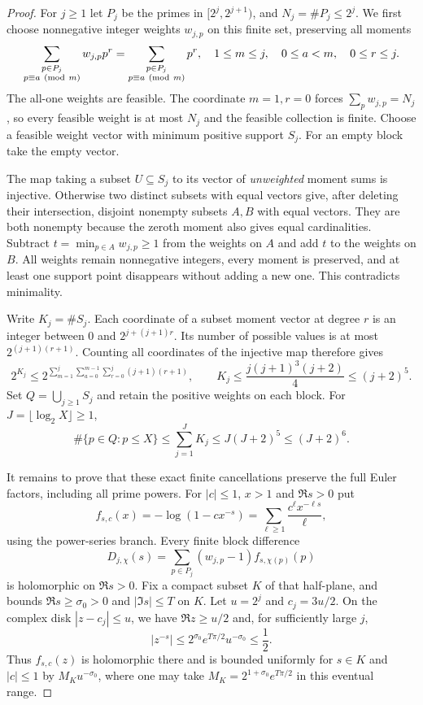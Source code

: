 \documentclass[11pt]{article}
\theoremstyle{definition}
\begin{document}
\begin{proof}
For $j\ge1$ let $P_j$ be the primes in $[2^j,2^{j+1})$,
and $N_j=\#P_j\le2^j$. We first choose nonnegative integer
weights $w_{j,p}$ on this finite set, preserving all moments
\begin{equation}\label{eq:prime-compression-moments}
 \sum_{\substack{p\in P_j\\p\equiv a\ ({\rm mod}\ m)}}
       w_{j,p}p^r
 =\sum_{\substack{p\in P_j\\p\equiv a\ ({\rm mod}\ m)}}p^r,
 \quad 1\le m\le j,\quad0\le a<m,\quad0\le r\le j.
\end{equation}
The all-one weights are feasible. The coordinate $m=1,r=0$
forces $\sum_p w_{j,p}=N_j$, so every feasible weight is
at most $N_j$ and the feasible collection is finite. Choose
a feasible weight vector with minimum positive support $S_j$.
For an empty block take the empty vector.

The map taking a subset $U\subseteq S_j$ to its vector of
\emph{unweighted} moment sums is injective. Otherwise two
distinct subsets with equal vectors give, after deleting their
intersection, disjoint nonempty subsets $A,B$ with equal
vectors. They are both nonempty because the zeroth moment
also gives equal cardinalities. Subtract
$t=\min_{p\in A}w_{j,p}\ge1$ from the weights on $A$ and add
$t$ to the weights on $B$. All weights remain nonnegative
integers, every moment is preserved, and at least one support
point disappears without adding a new one. This contradicts
minimality.

Write $K_j=\#S_j$. Each coordinate of a subset moment vector
at degree $r$ is an integer between $0$ and
$2^{j+(j+1)r}$. Its number of possible values is at most
$2^{(j+1)(r+1)}$. Counting all coordinates of the injective
map therefore gives
\[
 2^{K_j}\le
 2^{\sum_{m=1}^j\sum_{a=0}^{m-1}\sum_{r=0}^j
                         (j+1)(r+1)},\qquad
 K_j\le\frac{j(j+1)^3(j+2)}4\le(j+2)^5.
\]
Set $Q=\bigcup_{j\ge1}S_j$ and retain the positive weights
on each block. For $J=\lfloor\log_2X\rfloor\ge1$,
\[
 \#\{p\in Q:p\le X\}
 \le\sum_{j=1}^J K_j
 \le J(J+2)^5\le(J+2)^6.
\]

It remains to prove that these exact finite cancellations
preserve the full Euler factors, including all prime powers.
For $|c|\le1$, $x>1$ and $\Re s>0$ put
\[
 f_{s,c}(x)=-\log(1-cx^{-s})
           =\sum_{\ell\ge1}\frac{c^\ell x^{-\ell s}}\ell,
\]
using the power-series branch. Every finite block difference
\[
 D_{j,\chi}(s)=\sum_{p\in P_j}(w_{j,p}-1)f_{s,\chi(p)}(p)
\]
is holomorphic on $\Re s>0$. Fix a compact subset $K$ of
that half-plane, and bounds $\Re s\ge\sigma_0>0$ and
$|\Im s|\le T$ on $K$. Let $u=2^j$ and $c_j=3u/2$.
On the complex disk $|z-c_j|\le u$, we have
$\Re z\ge u/2$ and, for sufficiently large $j$,
\[
 |z^{-s}|\le2^{\sigma_0}e^{T\pi/2}u^{-\sigma_0}\le\frac12.
\]
Thus $f_{s,c}(z)$ is holomorphic there and is bounded uniformly
for $s\in K$ and $|c|\le1$ by $M_Ku^{-\sigma_0}$, where
one may take $M_K=2^{1+\sigma_0}e^{T\pi/2}$ in this
eventual range.


\end{proof}
\end{document}

